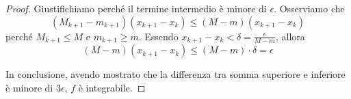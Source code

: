 \begin{proof}
Giustifichiamo perché il termine intermedio è minore di $\epsilon$. Osserviamo che 
\begin{equation*}
(M_{k+1}-m_{k+1})(x_{k+1}-x_k) \le (M-m)(x_{k+1}-x_k)
\end{equation*}
perché $M_{k+1} \le M$ e $m_{k+1} \ge m$. Essendo $x_{k+1}-x_k < \delta = \frac{\epsilon}{M-m}$, allora
\begin{equation*}
(M-m)(x_{k+1}-x_k) \le (M-m) \cdot \delta = \epsilon
\end{equation*}

In conclusione, avendo mostrato che la differenza tra somma superiore e inferiore è minore di $3\epsilon$, $f$ è integrabile.
\end{proof}
